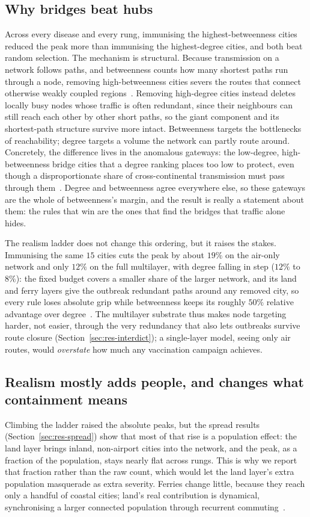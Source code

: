 \subsection{Why bridges beat hubs}
Across every disease and every rung, immunising the highest-betweenness cities reduced the peak
more than immunising the highest-degree cities, and both beat random selection. The mechanism is
structural. Because transmission on a network follows paths, and betweenness counts how many
shortest paths run through a node, removing high-betweenness cities severs the routes that connect
otherwise weakly coupled regions~\cite{kitsak:spreaders}. Removing high-degree cities instead
deletes locally busy nodes whose traffic is often redundant, since their neighbours can still reach
each other by other short paths, so the giant component and its shortest-path structure survive
more intact. Betweenness targets the bottlenecks of reachability; degree targets a volume the
network can partly route around. Concretely, the difference lives in the anomalous gateways: the
low-degree, high-betweenness bridge cities that a degree ranking places too low to protect, even
though a disproportionate share of cross-continental transmission must pass through
them~\cite{guimera:anomalous}. Degree and betweenness agree everywhere else, so these gateways are
the whole of betweenness's margin, and the result is really a statement about them: the rules that
win are the ones that find the bridges that traffic alone hides.

The realism ladder does not change this ordering, but it raises the stakes. Immunising the same
$15$ cities cuts the peak by about $19\%$ on the air-only network and only $12\%$ on the full
multilayer, with degree falling in step ($12\%$ to $8\%$): the fixed budget covers a smaller share
of the larger network, and its land and ferry layers give the outbreak redundant paths around any
removed city, so every rule loses absolute grip while betweenness keeps its roughly $50\%$ relative
advantage over degree~\cite{sorianopanos:multiplex}. The multilayer substrate thus makes node
targeting harder, not easier, through the very redundancy that also lets outbreaks survive route
closure (Section~\ref{sec:res-interdict}); a single-layer model, seeing only air routes, would
\emph{overstate} how much any vaccination campaign achieves.

\subsection{Realism mostly adds people, and changes what containment means}
Climbing the ladder raised the absolute peaks, but the spread results
(Section~\ref{sec:res-spread}) show that most of that rise is a population effect: the land layer
brings inland, non-airport cities into the network, and the peak, as a fraction of the population,
stays nearly flat across rungs. This is why we report that fraction rather than the raw count,
which would let the land layer's extra population masquerade as extra severity. Ferries change
little, because they reach only a handful of coastal cities; land's real contribution is dynamical,
synchronising a larger connected population through recurrent commuting~\cite{balcan:recurrent}.

